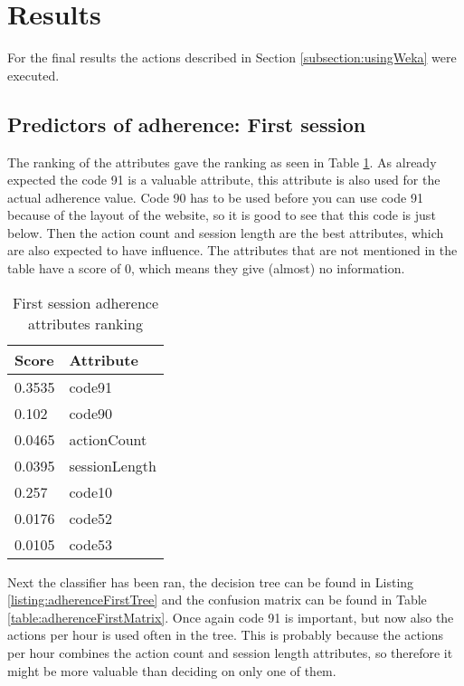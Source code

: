 \section{Results}
For the final results the actions described in Section \ref{subsection:usingWeka} were executed.

\subsection{Predictors of adherence: First session}
The ranking of the attributes gave the ranking as seen in Table \ref{table:adherenceFirstAttributes}. As already expected the code 91 is a valuable attribute, this attribute is also used for the actual adherence value. Code 90 has to be used before you can use code 91 because of the layout of the website, so it is good to see that this code is just below. Then the action count and session length are the best attributes, which are also expected to have influence. The attributes that are not mentioned in the table have a score of 0, which means they give (almost) no information.

\begin{table}[]
	\centering
	\caption{First session adherence \\attributes ranking}
	\label{table:adherenceFirstAttributes}
	\begin{tabular}{@{}ll@{}}
		\toprule
		\textbf{Score} & \textbf{Attribute} \\ \midrule
		0.3535         & code91             \\
		0.102          & code90             \\
		0.0465         & actionCount        \\
		0.0395         & sessionLength      \\
		0.257          & code10             \\
		0.0176         & code52             \\
		0.0105         & code53             \\ \bottomrule
	\end{tabular}
\end{table}

Next the  classifier has been ran, the decision tree can be found in Listing \ref{listing:adherenceFirstTree} and the confusion matrix can be found in Table \ref{table:adherenceFirstMatrix}. Once again code 91 is important, but now also the actions per hour is used often in the tree. This is probably because the actions per hour combines the action count and session length attributes, so therefore it might be more valuable than deciding on only one of them. 

